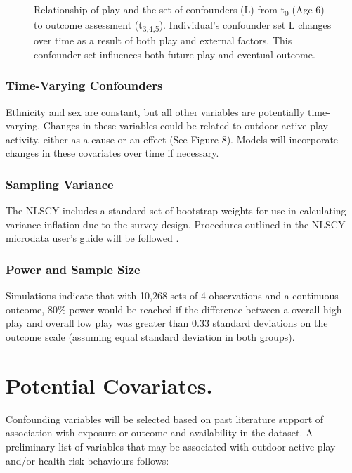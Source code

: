 \documentclass [11pt]{article}
\begin{document}
\begin{figure}
\caption{Relationship of play and the set of confounders (L) from t\textsubscript{0} (Age 6) to outcome assessment (t\textsubscript{3,4,5}). Individual's confounder set L changes over time as a result of both play and external factors. This confounder set influences both future play and eventual outcome.}
\label{timefig}
\end{figure}

\subsubsection{Time-Varying Confounders}

Ethnicity and sex are constant, but all other variables are potentially time-varying. Changes in these variables could be related to outdoor active play activity, either as a cause or an effect (See Figure 8). Models will incorporate changes in these covariates over time if necessary. 

\subsubsection{Sampling Variance}

The NLSCY includes a standard set of bootstrap weights for use in calculating variance inflation due to the survey design. Procedures outlined in the NLSCY microdata user's guide will be followed \cite{noauthor_undated-nd}. 

\subsubsection{Power and Sample Size}

Simulations indicate that with 10,268 sets of 4 observations and a continuous outcome, 80\% power would be reached if the difference between a overall high play and overall low play was greater than 0.33 standard deviations on the outcome scale (assuming equal standard deviation in both groups). 


\section{Potential Covariates.} Confounding variables will be selected based on past literature support of association with exposure or outcome and availability in the dataset. A preliminary list of variables that may be associated with outdoor active play and/or health risk behaviours follows:
\end{document}
